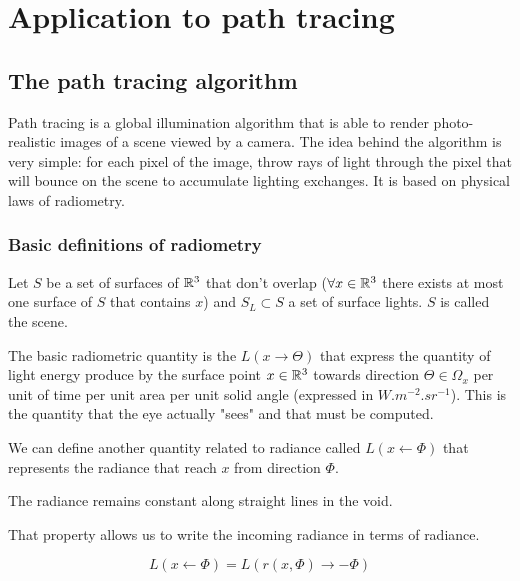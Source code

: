 

\section{Application to path tracing}

\subsection{The path tracing algorithm}

Path tracing is a global illumination algorithm that is able to render photo-realistic images of a scene viewed by a camera. The idea behind the algorithm is very simple: for each pixel of the image, throw rays of light through the pixel that will bounce on the scene to accumulate lighting exchanges. It is based on physical laws of radiometry.

\subsubsection{Basic definitions of radiometry}

Let $S$ be a set of surfaces of $\mathbb{R}^3$ that don't overlap ($\forall x \in \mathbb{R}^3$ there exists at most one surface of $S$ that contains $x$) and $S_L \subset S$ a set of surface lights. $S$ is called the scene.

The basic radiometric quantity is the  $L(x \rightarrow \Theta)$ that express the quantity of light energy produce by the surface point $x \in \mathbb{R}^3$ towards direction $\Theta \in \Omega_x$ per unit of time per unit area per unit solid angle (expressed in $W.m^{-2}.sr^{-1}$).
This is the quantity that the eye actually "sees" and that must be computed. 


We can define another quantity related to radiance called  $L(x \leftarrow \Phi)$ that represents the radiance that reach $x$ from direction $\Phi$.

\begin{property}

The radiance remains constant along straight lines in the void.

\end{property}

That property allows us to write the incoming radiance in terms of radiance.

\begin{equation*}
L(x \leftarrow \Phi) = L(r(x, \Phi) \rightarrow -\Phi)
\end{equation*}

